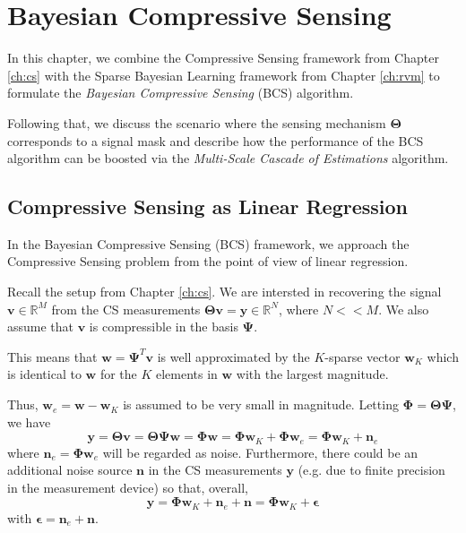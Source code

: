 \chapter{Bayesian Compressive Sensing}
\label{ch:msce}

In this chapter, we combine the Compressive Sensing framework from Chapter \ref{ch:cs} with the Sparse Bayesian Learning framework from Chapter \ref{ch:rvm} to formulate the \emph{Bayesian Compressive Sensing} (BCS) algorithm.

Following that, we discuss the scenario where the sensing mechanism $\bm\Theta$ corresponds to a signal mask and describe how the performance of the BCS algorithm can be boosted via the \emph{Multi-Scale Cascade of Estimations} algorithm.

\section{Compressive Sensing as Linear Regression}
In the Bayesian Compressive Sensing (BCS) \cite{ji2008} framework, we approach the Compressive Sensing problem from the point of view of linear regression.

Recall the setup from Chapter \ref{ch:cs}.
We are intersted in recovering the signal $\bm v\in\mathbb{R}^M$ from the CS measurements $\bm\Theta\bm v = \bm y\in\mathbb{R}^N$, where $N << M$.
We also assume that $\bm v$ is compressible in the basis $\bm \Psi$.

This means that $\bm w = \bm\Psi^T\bm v$ is well approximated by the $K$-sparse vector $\bm w_K$ which is identical to $\bm w$ for the $K$ elements in $\bm w$ with the largest magnitude.

Thus, $\bm w_e = \bm w - \bm w_K$ is assumed to be very small in magnitude.
Letting $\bm\Phi=\bm\Theta\bm\Psi$, we have
\begin{equation*}
  \bm y = \bm\Theta\bm v = \bm\Theta\bm\Psi\bm w = \bm\Phi\bm w = \bm\Phi\bm w_K + \bm\Phi\bm w_e = \bm\Phi\bm w_K + \bm n_e
\end{equation*}
where $\bm n_e = \bm\Phi\bm w_e$ will be regarded as noise.
Furthermore, there could be an additional noise source $\bm n$ in the CS measurements $\bm y$ (e.g. due to finite precision in the measurement device) so that, overall,
\begin{equation}
\label{eqn:bcs_setup}
  \bm y = \bm\Phi\bm w_K + \bm n_e + \bm n = \bm\Phi\bm w_K + \bm \epsilon
\end{equation}
with $\bm\epsilon = \bm n_e + \bm n$.

